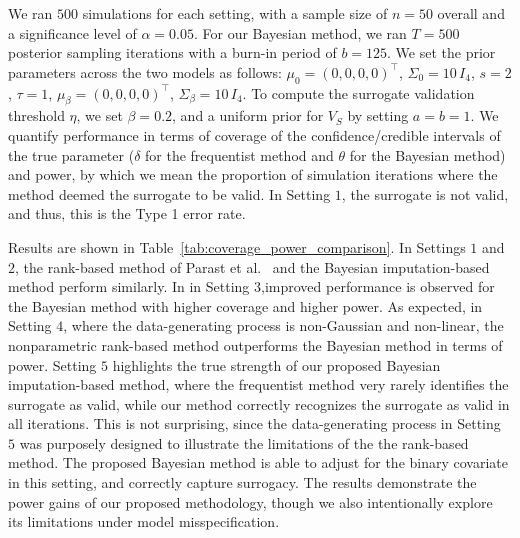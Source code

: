 \documentclass[12pt]{article}
\begin{document}
We ran \(500\) simulations for each setting, with a sample size of \(n = 50\) overall and a significance level of \(\alpha = 0.05\). For our Bayesian method, we ran \(T = 500\) posterior sampling iterations with a burn-in period of \(b = 125\). We set the prior parameters across the two models as follows: \(\mu_{0} = (0, 0, 0, 0)^{\top}\), \(\Sigma_{0} = 10 \, I_{4}\), \(s = 2\), \(\tau = 1\),  \(\mu_{\beta} = (0, 0, 0, 0)^{\top}\), \(\Sigma_{\beta} = 10 \, I_{4}\). To compute the surrogate validation threshold \(\eta\), we set \(\beta = 0.2\), and a uniform prior for \(V_{S}\) by setting \(a = b = 1\). We quantify performance in terms of coverage of the confidence/credible intervals of the true parameter (\(\delta\) for the frequentist method and \(\theta\) for the Bayesian method) and power, by which we mean the proportion of simulation iterations where the method deemed the surrogate to be valid. In Setting $1$, the surrogate is not valid, and thus, this is the Type 1 error rate. 

Results are shown in Table~\ref{tab:coverage_power_comparison}. In Settings \(1\) and \(2\), the rank-based method of Parast et al.\ \citep{parast2024rank} and the Bayesian imputation-based method perform similarly. In in Setting \(3\),improved performance is observed for the Bayesian method with higher coverage and higher power. As expected, in Setting \(4\), where the data-generating process is non-Gaussian and non-linear, the nonparametric rank-based method outperforms the Bayesian method in terms of power. Setting  \(5\) highlights the true strength of our proposed Bayesian imputation-based method, where the frequentist method very rarely identifies the surrogate as valid, while our method correctly recognizes the surrogate as valid in all iterations. This is not surprising, since the data-generating process in Setting \(5\) was purposely designed to illustrate the limitations of the  the rank-based method.  The proposed Bayesian method is able to adjust for the binary covariate in this setting, and correctly capture surrogacy. The results demonstrate the power gains of our proposed methodology, though we also intentionally explore its limitations under model misspecification.
\end{document}
